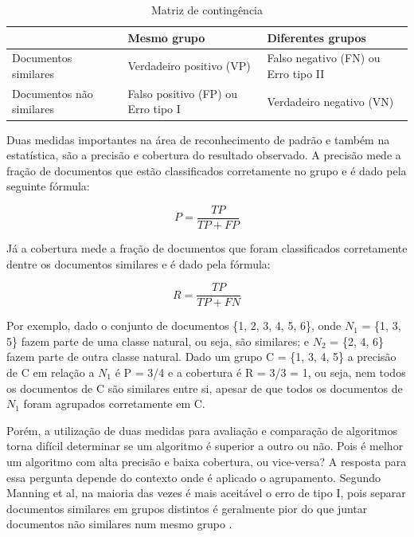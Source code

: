 \documentclass[a4paper,12pt]{article}
\begin{document}
\begin{table}[h]
\centering
\begin{tabular}{ | p{3cm} | p{4cm} | p{4cm} | }
\hline
& Mesmo grupo & Diferentes grupos                                                                   \\ \hline
Documentos similares	& Verdadeiro positivo (VP) & Falso negativo (FN) ou Erro tipo II \\ \hline
Documentos não similares	&  Falso positivo (FP) ou Erro tipo I & Verdadeiro negativo (VN) \\
\hline
\end{tabular}
\caption{Matriz de contingência}
\label{table:matrix_contingencia}
\end{table}

Duas medidas importantes na área de reconhecimento de padrão e também na estatística, são a precisão e cobertura do resultado observado. A precisão mede a fração de documentos que estão classificados corretamente no grupo e é dado pela seguinte fórmula:

\begin{equation} P = \frac{TP} {TP + FP} \end{equation}

Já a cobertura mede a fração de documentos que foram classificados corretamente dentre os documentos similares e é dado pela fórmula:

\begin{equation} R = \frac{TP} {TP + FN} \end{equation}

Por exemplo, dado o conjunto de documentos \{1, 2, 3, 4, 5, 6\}, onde $N_{1}$ = \{1, 3, 5\} fazem parte de uma classe natural, ou seja, são similares; e $N_{2}$ = \{2, 4, 6\} fazem parte de outra classe natural. Dado um grupo C = \{1, 3, 4, 5\} a precisão de C em relação a $N_{1}$ é P = 3/4 e a cobertura é R = 3/3 = 1, ou seja, nem todos os documentos de C são similares entre si, apesar de que todos os documentos de $N_{1}$ foram agrupados corretamente em C.

Porém, a utilização de duas medidas para avaliação e comparação de algoritmos torna difícil determinar se um algoritmo é superior a outro ou não. Pois é melhor um algoritmo com alta precisão e baixa cobertura, ou vice-versa? A resposta para essa pergunta depende do contexto onde é aplicado o agrupamento. Segundo Manning et al, na maioria das vezes é mais aceitável o erro de tipo I, pois separar documentos similares em grupos distintos é geralmente pior do que juntar documentos não similares num mesmo grupo \cite{Ester03}.
\end{document}
